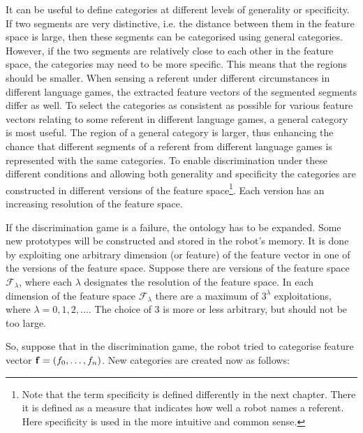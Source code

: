 It can be useful to define categories at different levels of generality or specificity. If two segments are very distinctive, i.e. the distance between them in the feature space is large, then these segments can be categorised using general categories. However, if the two segments are relatively close to each other in the feature space, the categories may need to be more specific. This means that the regions should be smaller. When sensing a referent under different circumstances in different language games, the extracted feature vectors of the segmented segments differ as well. To select the categories as consistent as possible for various feature vectors relating to some referent in different language games, a general category is most useful. The region of a general category is larger, thus enhancing the chance that different segments of a referent from different language games is represented with the same categories. To enable discrimination under these different conditions and allowing both generality and specificity the categories are constructed in different versions of the feature space\footnote{Note that the term specificity is defined differently in the next chapter. There it is defined as a measure that indicates how well a robot names a referent. Here specificity is used in the more intuitive and common sense.}. Each version has an increasing resolution of the feature space.


If the discrimination game is a failure, the ontology has to be expanded. Some new prototypes will be constructed and stored in the robot's memory. It is done by exploiting one arbitrary dimension (or feature) of the feature vector in one of the versions of the feature space. Suppose there are versions of the feature space ${\mathcal F}_\lambda$, where each $\lambda$ designates the resolution of the feature space. In each dimension of the feature space ${\mathcal F}_\lambda$ there are a maximum of $3^\lambda$ exploitations, where $\lambda=0,1,2,\ldots$. The choice of 3 is more or less arbitrary, but should not be too large. 

So, suppose that in the discrimination game, the robot tried to categorise feature vector ${\bf f}=(f_0,\ldots,f_n)$. New categories are created now as follows:


